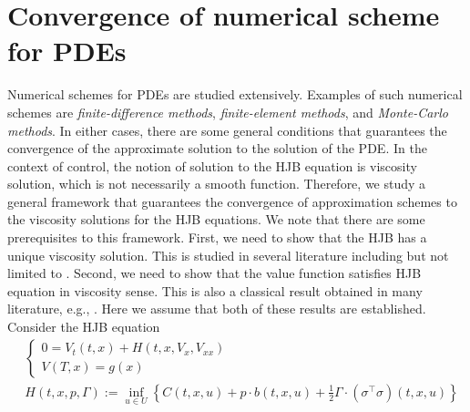 \documentclass[11pt]{book}
\begin{document}
\section{Convergence of numerical scheme for PDEs}
Numerical schemes for PDEs are studied extensively. Examples of such numerical schemes are \emph{finite-difference methods}, \emph{finite-element methods}, and \emph{Monte-Carlo methods}. In either cases, there are some general conditions that guarantees the convergence of the approximate solution to the solution of the PDE. In the context of control, the notion of solution to the HJB equation is viscosity solution, which is not necessarily a smooth function. Therefore, we study a general framework that guarantees the convergence of approximation schemes to the viscosity solutions for the HJB equations. We note that there are some prerequisites to this framework. First, we need to show that the HJB has a unique viscosity solution. This is studied in several literature including but not limited to \cite{CIL92,Fleming-Soner-book-06,Touzi12}. Second, we need to show that the value function satisfies HJB equation in viscosity sense. This is also a classical result obtained in many literature, e.g., \citet{Fleming-Soner-book-06,Touzi12}. Here we assume that both of these results are established. Consider the HJB equation
\begin{align}
     &\begin{cases}
    0= V_t(t,x) + H(t,x,V_x,V_{xx})\\
    V(T,x)=g(x)
\end{cases}\label{eqn:HJB_multi}\\
&\hspace{0cm}H(t,x,p,\Gamma):=\inf_{u\in U}\left\{ C(t,x,u)  + p\cdot b(t,x,u)+\frac12 \Gamma\cdot  (\sigma^\top\sigma)(t,x,u)\right\}\label{eqn:Hamilton_multi}
\end{align}
\end{document}
